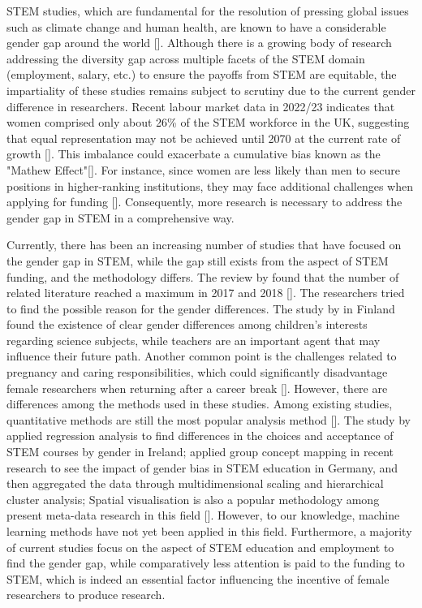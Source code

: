 STEM studies, which are fundamental for the resolution of pressing global issues such as climate change and human health, are known to have a considerable gender gap around the world [\cite{garcia2019bridging, Flavia}]. Although there is a growing body of research addressing the diversity gap across multiple facets of the STEM domain (employment, salary, etc.) to ensure the payoffs from STEM are equitable, the impartiality of these studies remains subject to scrutiny due to the current gender difference in researchers. Recent labour market data in 2022/23 indicates that women comprised only about 26\% of the STEM workforce in the UK, suggesting that equal representation may not be achieved until 2070 at the current rate of growth [\cite{womenSTEM}]. This imbalance could exacerbate a cumulative bias known as the "Mathew Effect"[\cite{jebsen2020review}]. For instance, since women are less likely than men to secure positions in higher-ranking institutions, they may face additional challenges when applying for funding [\cite{cruz2022gender}]. Consequently, more research is necessary to address the gender gap in STEM in a comprehensive way.

Currently, there has been an increasing number of studies that have focused on the gender gap in STEM, while the gap still exists from the aspect of STEM funding, and the methodology differs. The review by \cite{verdugo2022gender} found that the number of related literature reached a maximum in 2017 and 2018 [\cite{verdugo2022gender}]. The researchers tried to find the possible reason for the gender differences. The study by \cite{kang2019gender} in Finland found the existence of clear gender differences among children's interests regarding science subjects, while teachers are an important agent that may influence their future path. Another common point is the challenges related to pregnancy and caring responsibilities, which could significantly disadvantage female researchers when returning after a career break [\cite{craig2011non}].
However, there are differences among the methods used in these studies. Among existing studies, quantitative methods are still the most popular analysis method [\cite{verdugo2022gender}]. The study by \cite{delaney2019understanding} applied regression analysis to find differences in the choices and acceptance of STEM courses by gender in Ireland; \cite{kube2024addressing} applied group concept mapping in recent research to see the impact of gender bias in STEM education in Germany, and then aggregated the data through multidimensional scaling and hierarchical cluster analysis; Spatial visualisation is also a popular methodology among present meta-data research in this field [\cite{doi:10.1080/0020739X.2019.1640398}]. However, to our knowledge, machine learning methods have not yet been applied in this field. Furthermore, a majority of current studies focus on the aspect of STEM education and employment to find the gender gap, while comparatively less attention is paid to the funding to STEM, which is indeed an essential factor influencing the incentive of female researchers to produce research.

